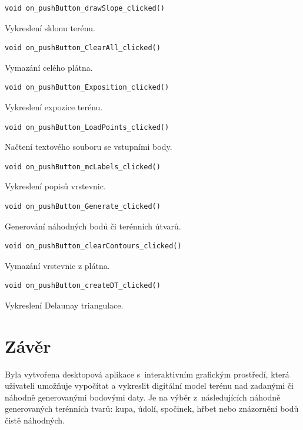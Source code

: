 \documentclass[a4paper, 12pt, oneside, titlepage]{article} %
\begin{document}
\begin{verbatim}
void on_pushButton_drawSlope_clicked()
\end{verbatim}
Vykreslení sklonu terénu.\\

\begin{verbatim}
void on_pushButton_ClearAll_clicked()
\end{verbatim}
Vymazání celého plátna.\\

\begin{verbatim}
void on_pushButton_Exposition_clicked()
\end{verbatim}
Vykreslení expozice terénu.\\

\begin{verbatim}
void on_pushButton_LoadPoints_clicked()
\end{verbatim}
Načtení textového souboru se vstupními body.\\

\begin{verbatim}
void on_pushButton_mcLabels_clicked()
\end{verbatim}
Vykreslení popisů vrstevnic.\\

\begin{verbatim}
void on_pushButton_Generate_clicked()
\end{verbatim}
Generování náhodných bodů či terénních útvarů.\\

\begin{verbatim}
void on_pushButton_clearContours_clicked()
\end{verbatim}
Vymazání vrstevnic z plátna.\\

\begin{verbatim}
void on_pushButton_createDT_clicked()
\end{verbatim}
Vykreslení Delaunay triangulace.\\

\section{Závěr}
Byla vytvořena desktopová aplikace s~interaktivním grafickým prostředí, která uživateli umožňuje vypočítat a vykreslit digitální model terénu nad zadanými či náhodně generovanými bodovými daty. Je na výběr z~následujících náhodně generovaných terénních tvarů: kupa, údolí, spočinek, hřbet nebo znázornění bodů čistě náhodných. 
\end{document}
